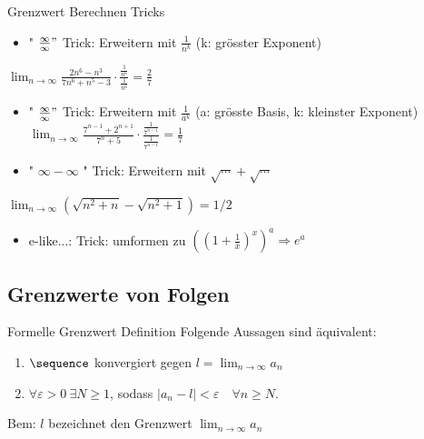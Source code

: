 \begin{KR}{Grenzwert Berechnen Tricks}
    \begin{itemize}
        \item " $\frac{\infty}{\infty} "$ Trick: Erweitern mit $\frac{1}{n^{k}}$ (k: grösster Exponent)
    \end{itemize}
    
    $\lim _{n \rightarrow \infty} \frac{2 n^{6}-n^{3}}{7 n^{6}+n^{5}-3} \cdot \frac{\frac{1}{n^{6}}}{\frac{1}{n^{6}}}=\frac{2}{7}$
    
    \begin{itemize}
        \item " $\frac{\infty}{\infty} "$ Trick: Erweitern mit $\frac{1}{a^{k}}$ (a: grösste Basis, k: kleinster Exponent) $\lim _{n \rightarrow \infty} \frac{7^{n-1}+2^{n+1}}{7^{n}+5} \cdot \frac{\frac{1}{7^{n-1}}}{\frac{1}{7^{n-1}}}=\frac{1}{7}$
        \item " $\infty-\infty$ " Trick: Erweitern mit $\sqrt{\cdots}+\sqrt{\cdots}$
    \end{itemize}
    
    $\lim _{n \rightarrow \infty}\left(\sqrt{n^{2}+n}-\sqrt{n^{2}+1}\right)=1 / 2$
    
    \begin{itemize}
        \item e-like...: Trick: umformen zu $\left(\left(1+\frac{1}{x}\right)^{x}\right)^{a} \Rightarrow e^{a}$
    \end{itemize}
\end{KR}

\raggedcolumns
\columnbreak

\subsection{Grenzwerte von Folgen}

\begin{definition}{Formelle Grenzwert Definition}
    Folgende Aussagen sind äquivalent:
    \begin{enumerate}
        \item $\sequence$ konvergiert gegen $l = \lim_{n \to \infty} a_n$
        \item $\forall \varepsilon > 0~\exists N \geq 1$, sodass $|a_n -l | < \varepsilon \quad \forall n \geq N$.
    \end{enumerate}
\end{definition}

\begin{remark}
    Bem: $l$ bezeichnet den Grenzwert $\lim_{n \to \infty} a_n$
\end{remark}

